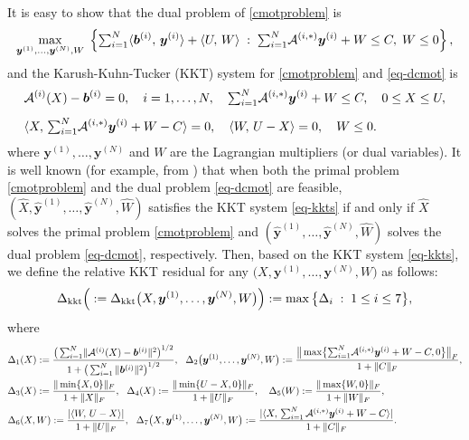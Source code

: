 \documentclass[10pt]{article}
\newcommand{\cA}{{\cal A}}
\newcommand{\inprod}[2]{\langle #1 , #2 \rangle }
\newcommand{\norm}[1]{\left\lVert#1\right\rVert}
\def\inprod#1#2{\langle#1,\,#2\rangle}
\def\norm#1{\|#1\|}
\begin{document}
It is easy to show that the dual problem of \eqref{cmotproblem} is
\begin{equation}\label{eq-dcmot}
\max_{\bm{y}^{(1)},\dots,\bm{y}^{(N)},W}\;\left\{ {\textstyle\sum_{i=1}^N}\inprod{\bm{b}^{(i)}}{\bm{y}^{(i)}} +\inprod{U}{W} \;:\; {\textstyle\sum_{i=1}^N}\cA^{(i,*)}\bm{y}^{(i)}+ W\leq C,\; W\leq 0  \right\},
\end{equation}
and the Karush-Kuhn-Tucker (KKT) system for \eqref{cmotproblem} and \eqref{eq-dcmot} is
\begin{equation}\label{eq-kkts}
\begin{split}
& \cA^{(i)}(X) - \bm{b}^{(i)} = 0,\quad i = 1,\dots, N,\quad \mbox{$\sum_{i=1}^N$} \cA^{(i,*)}\bm{y}^{(i)}+ W\leq C,\quad 0\leq X\leq U,\\[5pt]
& \inprod{X}{\mbox{$\sum_{i=1}^N$} \cA^{(i,*)}\bm{y}^{(i)}+ W - C} = 0,\quad \inprod{W}{U-X} = 0,\quad W\leq 0.
\end{split}
\end{equation}
where $\bm{y}^{(1)},\dots,\bm{y}^{(N)}$ and $W$ are the Lagrangian multipliers (or dual variables). It is well known (for example, from \cite[Section 4.3]{bt1997introduction}) that when both the primal problem \eqref{cmotproblem} and the dual problem \eqref{eq-dcmot} are feasible, $(\widehat{X},\widehat{\bm{y}}^{(1)},\dots,\widehat{\bm{y}}^{(N)},\widehat{W})$ satisfies the KKT system \eqref{eq-kkts} if and only if $\widehat{X}$ solves the primal problem \eqref{cmotproblem} and $(\widehat{\bm{y}}^{(1)},\dots,\widehat{\bm{y}}^{(N)},\widehat{W})$ solves the dual problem \eqref{eq-dcmot}, respectively. Then, based on the KKT system \eqref{eq-kkts}, we define the relative KKT residual for any $\big(X,\bm{y}^{(1)},\dots,\bm{y}^{(N)},W \big)$ as follows:
\begin{equation*}
\Delta_{\rm kkt}\Big(:=\Delta_{\rm kkt}\big(X,\bm{y}^{(1)},\dots,\bm{y}^{(N)},W \big)\Big): = \max \big\{  \Delta_i \;:\; 1\leq i\leq 7 \big\},
\end{equation*}
where
\begin{align*}
& \Delta_1(X): = \frac{\big( \sum_{i = 1}^N\!\norm{\cA^{(i)}(X) - \bm{b}^{(i)}}^2 \big)^{1/2}}{1+\big( \sum_{i = 1}^N\norm{\bm{b}^{(i)}}^2 \big)^{1/2}},
~~\Delta_2\big(\bm{y}^{(1)},\dots,\bm{y}^{(N)},W \big): = \frac{\big\|\max\!\big\{ \!\sum_{i=1}^N\!\cA^{(i,*)}\bm{y}^{(i)}+ W - C,0 \big\}\big\|_F}{1+\norm{C}_F}, \\
& \Delta_3(X) := \frac{\norm{\min\{ X,0 \}}_F}{1+\norm{X}_F},
~~\Delta_4(X): = \frac{\norm{\min\{ U-X,0\}}_F}{1+\norm{U}_F},\quad  \Delta_5(W) := \frac{\norm{\max\{ W,0 \}}_F}{1+\norm{W}_F}, \\
& \Delta_6(X,W): = \frac{|\inprod{W}{U-X}|}{1+\norm{U}_F},
~~\Delta_7\big( X,\bm{y}^{(1)},\dots,\bm{y}^{(N)},W \big): = \frac{|\inprod{X}{\sum_{i=1}^N\cA^{(i,*)}\bm{y}^{(i)}+ W - C}|}{1+\norm{C}_F}.
\end{align*}
\end{document}
